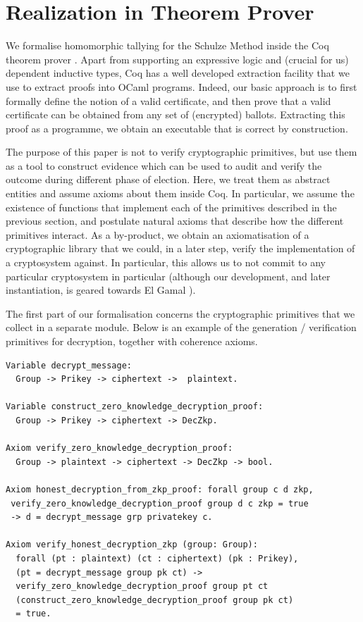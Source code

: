 \section{Realization in Theorem Prover}
   	We formalise homomorphic tallying for the Schulze Method inside the
Coq theorem prover \cite{Bertot:2004:ITP}. Apart from supporting an
expressive logic and (crucial for us) dependent inductive types, Coq
has a well developed extraction facility that 
we use to extract proofs into OCaml programs. Indeed, our basic
approach is to first formally define the notion of a valid
certificate, and then prove that a valid certificate can be obtained
from any set of (encrypted) ballots. Extracting this proof as a
programme, we obtain an executable that is correct by construction. 

The purpose of this paper is not to verify cryptographic primitives, 
but use them as a tool to construct evidence which can be used 
to audit and verify the outcome during different phase 
of election. Here, we treat them as abstract entities and assume
axioms about them inside Coq.
In particular, we assume the existence of functions that implement
each of the primitives described in the previous section, and
postulate natural axioms that describe how the different primitives
interact. As a by-product, we obtain an axiomatisation of a
cryptographic library that we could, in a later step, verify the
implementation of a cryptosystem against.  In particular, this
allows us to not commit to any particular cryptosystem in particular
(although our development, and later instantiation, is geared
towards El Gamal \cite{DBLP:conf/crypto/Gamal84}).

The first part of our formalisation concerns the cryptographic
primitives that we collect in a separate module. Below is an example
of the generation / verification primitives for decryption, together
with coherence axioms.
\begin{lstlisting}[frame=single,basicstyle=\ttfamily\footnotesize]
Variable decrypt_message: 
  Group -> Prikey -> ciphertext ->  plaintext.

Variable construct_zero_knowledge_decryption_proof:
  Group -> Prikey -> ciphertext -> DecZkp.

Axiom verify_zero_knowledge_decryption_proof:
  Group -> plaintext -> ciphertext -> DecZkp -> bool.

Axiom honest_decryption_from_zkp_proof: forall group c d zkp, 
 verify_zero_knowledge_decryption_proof group d c zkp = true 
 -> d = decrypt_message grp privatekey c.
 
Axiom verify_honest_decryption_zkp (group: Group):
  forall (pt : plaintext) (ct : ciphertext) (pk : Prikey),
  (pt = decrypt_message group pk ct) ->
  verify_zero_knowledge_decryption_proof group pt ct 
  (construct_zero_knowledge_decryption_proof group pk ct) 
  = true.
  

\end{lstlisting}
  
